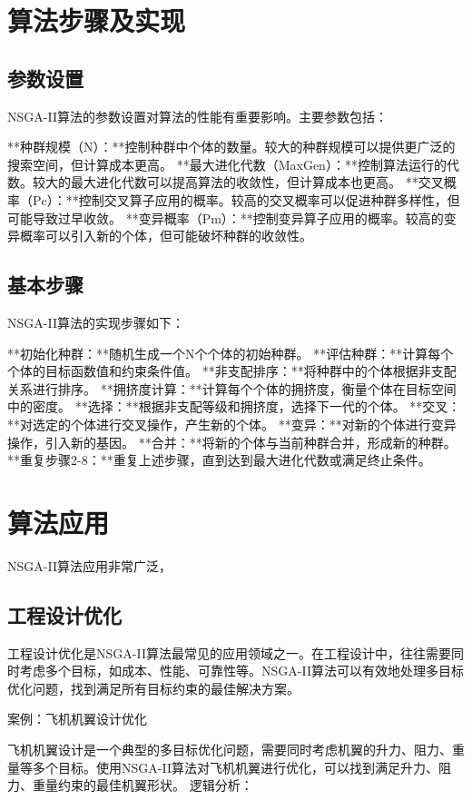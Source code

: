 \documentclass[cn,hazy,black,normal]{elegantnote}
\begin{document}
\section{算法步骤及实现}
\subsection{参数设置}
NSGA-II算法的参数设置对算法的性能有重要影响。主要参数包括：

**种群规模（N）：**控制种群中个体的数量。较大的种群规模可以提供更广泛的搜索空间，但计算成本更高。
**最大进化代数（MaxGen）：**控制算法运行的代数。较大的最大进化代数可以提高算法的收敛性，但计算成本也更高。
**交叉概率（Pc）：**控制交叉算子应用的概率。较高的交叉概率可以促进种群多样性，但可能导致过早收敛。
**变异概率（Pm）：**控制变异算子应用的概率。较高的变异概率可以引入新的个体，但可能破坏种群的收敛性。

\subsection{基本步骤}

NSGA-II算法的实现步骤如下：

**初始化种群：**随机生成一个N个个体的初始种群。
**评估种群：**计算每个个体的目标函数值和约束条件值。
**非支配排序：**将种群中的个体根据非支配关系进行排序。
**拥挤度计算：**计算每个个体的拥挤度，衡量个体在目标空间中的密度。
**选择：**根据非支配等级和拥挤度，选择下一代的个体。
**交叉：**对选定的个体进行交叉操作，产生新的个体。
**变异：**对新的个体进行变异操作，引入新的基因。
**合并：**将新的个体与当前种群合并，形成新的种群。
**重复步骤2-8：**重复上述步骤，直到达到最大进化代数或满足终止条件。

\section{算法应用}
NSGA-II算法应用非常广泛，

\subsection{工程设计优化}

工程设计优化是NSGA-II算法最常见的应用领域之一。在工程设计中，往往需要同时考虑多个目标，如成本、性能、可靠性等。NSGA-II算法可以有效地处理多目标优化问题，找到满足所有目标约束的最佳解决方案。

案例：飞机机翼设计优化

飞机机翼设计是一个典型的多目标优化问题，需要同时考虑机翼的升力、阻力、重量等多个目标。使用NSGA-II算法对飞机机翼进行优化，可以找到满足升力、阻力、重量约束的最佳机翼形状。
逻辑分析：
\end{document}
